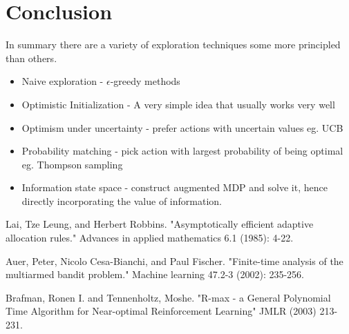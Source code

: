 \documentclass{article}
\begin{document}
\section{Conclusion}
In summary there are a variety of exploration techniques some more principled than others.
\begin{itemize}
\item Naive exploration - $\epsilon$-greedy methods
\item Optimistic Initialization - A very simple idea that usually works very well
\item Optimism under uncertainty - prefer actions with uncertain values eg. UCB 
\item Probability matching - pick action with largest probability of being optimal eg. Thompson sampling
\item Information state space - construct augmented MDP and solve it, hence directly incorporating the value of information.
\end{itemize}
\begin{thebibliography}{9}

Lai, Tze Leung, and Herbert Robbins. "Asymptotically efficient adaptive allocation rules." Advances in applied mathematics 6.1 (1985): 4-22.

Auer, Peter, Nicolo Cesa-Bianchi, and Paul Fischer. "Finite-time analysis of the multiarmed bandit problem." Machine learning 47.2-3 (2002): 235-256.

Brafman, Ronen I. and Tennenholtz, Moshe. "R-max - a General Polynomial Time Algorithm for Near-optimal Reinforcement Learning" JMLR (2003) 213-231.

\end{thebibliography}
\end{document}
